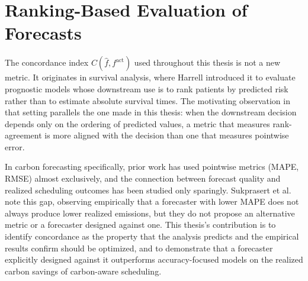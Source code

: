 \section{Ranking-Based Evaluation of Forecasts}
\label{sec:related-concordance}

The concordance index $C(\hat{f}, f^{\text{act}})$ used throughout this thesis is not a new metric.
It originates in survival analysis, where Harrell \cite{harrell_concordance_1996} introduced it to evaluate prognostic models whose downstream use is to rank patients by predicted risk rather than to estimate absolute survival times.
The motivating observation in that setting parallels the one made in this thesis: when the downstream decision depends only on the ordering of predicted values, a metric that measures rank-agreement is more aligned with the decision than one that measures pointwise error.

In carbon forecasting specifically, prior work has used pointwise metrics (MAPE, RMSE) almost exclusively, and the connection between forecast quality and realized scheduling outcomes has been studied only sparingly.
Sukprasert et al.\ \cite{sukprasert_limitations_2024} note this gap, observing empirically that a forecaster with lower MAPE does not always produce lower realized emissions, but they do not propose an alternative metric or a forecaster designed against one.
This thesis's contribution is to identify concordance as the property that the analysis predicts and the empirical results confirm should be optimized, and to demonstrate that a forecaster explicitly designed against it outperforms accuracy-focused models on the realized carbon savings of carbon-aware scheduling.
